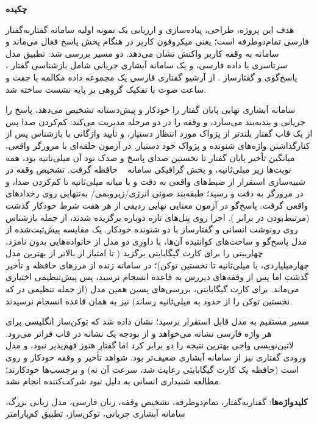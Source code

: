 


\begin{center}
\textbf{چکیده}
\end{center}

\begingroup
\setlength{\parskip}{0.22em}
\linespread{1.45}\selectfont
\noindent
هدف این پروژه، طراحی، پیاده‌سازی و ارزیابی یک نمونه اولیه سامانه گفتار‌به‌گفتار
فارسی تمام‌دوطرفه است؛ یعنی میکروفون کاربر در هنگام پخش پاسخ فعال می‌ماند و
سامانه به وقفه کاربر واکنش نشان می‌دهد. دو مسیر بررسی شد: تطبیق مدل سرتاسری
 با داده فارسی، و یک سامانه آبشاری جریانی شامل بازشناسی گفتار
، پاسخ‌گوی  و گفتارساز . از آرشیو
گفتاری فارسی یک مجموعه داده مکالمه با  جفت و  ساعت صوت با
تفکیک گروهی بر پایه نشست ساخته شد.

سامانه آبشاری نهایی پایان گفتار را خودکار و پیش‌دستانه تشخیص می‌دهد، پاسخ را
جریانی و بند‌به‌بند می‌سازد، و وقفه را در دو مرحله مدیریت می‌کند: کم‌کردن صدا
پس از یک قاب گفتار بلندتر از پژواک مورد انتظار دستیار، و تأیید واژگانی با
بازشناس پس از کنارگذاشتن واژه‌های شنونده و پژواک خود دستیار. در آزمون
حلقه‌ای با مرورگر واقعی، میانگین تأخیر پایان گفتار تا نخستین صدای پاسخ
 و صدک نود آن  میلی‌ثانیه بود، همه نوبت‌ها زیر 
میلی‌ثانیه، و بخش گرافیکی سامانه ~ حافظه گرفت. تشخیص وقفه در شبیه‌سازی استقرار از ضبط‌های واقعی به دقت
 و   با میانه  میلی‌ثانیه تا کم‌کردن صدا، و
در مرورگر به دقت  و   رسید؛ طبقه‌بند صوتی انرژی/زیر‌و‌بمی/
به‌تنهایی روی رخدادهای واقعی  گرفت. پاسخ‌گو در آزمون معنایی نهایی
 ردیفی از هر هفت شرط خودکار گذشت (مرتبط‌بودن  در برابر
). اجزا روی پنل‌های تازه دوباره برگزیده شدند، از جمله بازشناس روی
رونوشت انسانی و گفتارساز با دو شنونده خودکار. یک مقایسه پیش‌ثبت‌شده از  مدل
پاسخ‌گو و ساخت‌های کوانتیده آن‌ها، با داوری دو مدل از خانواده‌هایی بدون نامزد،
 چهاربیتی را برای کارت  گیگابایتی برگزید ( تا
 امتیاز از  بالاتر از بهترین مدل چهارمیلیاردی، با 
میلی‌ثانیه تا نخستین توکن)؛ در سامانه زنده از مرزهای حافظه و تأخیر گذشت اما
پس از وقفه‌های دیررس به قاعده انسجام نرسید، پس پیش‌تنظیمی اختیاری می‌ماند. برای
کارت  گیگابایتی، بررسی‌های پسین همین مدل (از جمله تنظیمی در  که
نخستین توکن را از حدود  به  میلی‌ثانیه رساند) نیز به همان قاعده انسجام
نرسیدند.

مسیر مستقیم به مدل قابل استقرار نرسید؛ نشان داده شد که توکن‌ساز انگلیسی
 برای هر واژه فارسی  نشانه می‌خواهد و از بودجه یک نشانه در
قاب فراتر می‌رود. لاتین‌نویسی واجی بهترین نتیجه را دو برابر کرد اما گفتار هنوز
فهم‌پذیر نبود، و مدل ورودی گفتاری  نیز از سامانه آبشاری ضعیف‌تر
بود. شواهد تأخیر و وقفه خودکار و روی  است (حافظه یک کارت 
گیگابایتی رعایت شد، سرعت آن نه) و برچسب‌ها خودکارند؛ مطالعه شنیداری
انسانی به دلیل نبود شرکت‌کننده انجام نشد.

\vspace{0.6em}
\noindent \textbf{کلیدواژه‌ها}:
گفتار‌به‌گفتار، تمام‌دوطرفه، تشخیص وقفه، زبان فارسی، مدل زبانی بزرگ،
سامانه آبشاری جریانی، توکن‌ساز، تطبیق کم‌پارامتر
\endgroup
\newpage
